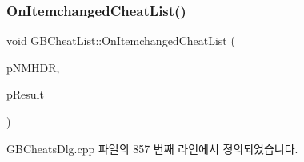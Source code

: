 \mbox{\label{class_g_b_cheat_list_a35c4625f3b1696bf7647d23831ae310b}} 
\subsubsection{\texorpdfstring{On\+Itemchanged\+Cheat\+List()}{OnItemchangedCheatList()}}
{\footnotesize\ttfamily void G\+B\+Cheat\+List\+::\+On\+Itemchanged\+Cheat\+List (\begin{DoxyParamCaption}\item[{N\+M\+H\+DR $\ast$}]{p\+N\+M\+H\+DR,  }\item[{L\+R\+E\+S\+U\+LT $\ast$}]{p\+Result }\end{DoxyParamCaption})\hspace{0.3cm}{\ttfamily [protected]}}



G\+B\+Cheats\+Dlg.\+cpp 파일의 857 번째 라인에서 정의되었습니다.


